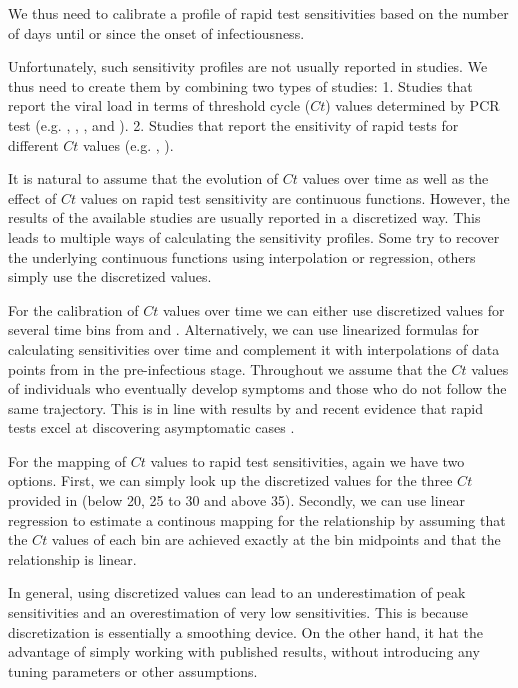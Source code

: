We thus need to calibrate a profile of rapid test sensitivities based on the
number of days until or since the onset of infectiousness.

Unfortunately, such sensitivity profiles are not usually reported in studies. We
thus need to create them by combining two types of studies: 1. Studies that
report the viral load in terms of threshold cycle ($Ct$) values determined by
PCR test (e.g. \cite{Cosentino2022}, \cite{Ong2021}, \cite{Bonnet2022},
\cite{Jang2021} and \cite{Zuin2021}). 2. Studies that report the ensitivity of
rapid tests for different $Ct$ values (e.g. \cite{Scheiblauer2021},
\cite{Bruemmer2021}).


It is natural to assume that the evolution of $Ct$ values over time as well as
the effect of $Ct$ values on rapid test sensitivity are continuous functions.
However, the results of the available studies are usually reported in a
discretized way. This leads to multiple ways of calculating the sensitivity
profiles. Some try to recover the underlying continuous functions using
interpolation or regression, others simply use the discretized values.

For the calibration of $Ct$ values over time we can either use discretized
values for several time bins from \cite{Ong2021} and \cite{Jang2021}.
Alternatively, we can use linearized formulas for calculating sensitivities over
time \cite{Cosentino2022} and complement it with interpolations of data points
from \cite{Jang2021} in the pre-infectious stage. Throughout we assume that the
$Ct$ values of individuals who eventually develop symptoms and those who do not
follow the same trajectory. This is in line with results by \cite{Zuin2021} and
recent evidence that rapid tests excel at discovering asymptomatic cases
\cite{Rosella2022}.

For the mapping of $Ct$ values to rapid test sensitivities, again we have two
options. First, we can simply look up the discretized values for the three $Ct$
provided in \cite{Scheiblauer2021} (below 20, 25 to 30 and above 35). Secondly,
we can use linear regression to estimate a continous mapping for the
relationship by assuming that the $Ct$ values of each bin are achieved exactly
at the bin midpoints and that the relationship is linear.

In general, using discretized values can lead to an underestimation of peak
sensitivities and an overestimation of very low sensitivities. This is because
discretization is essentially a smoothing device. On the other hand, it hat the
advantage of simply working with published results, without introducing any
tuning parameters or other assumptions.


